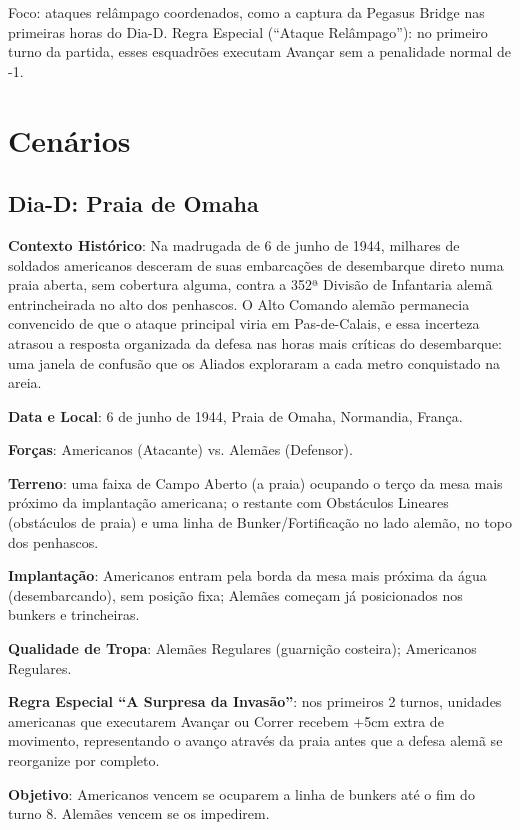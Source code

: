 \documentclass[11pt]{article}
\begin{document}
Foco: ataques relâmpago coordenados, como a captura da Pegasus Bridge nas primeiras horas do Dia-D. Regra Especial (``Ataque Relâmpago''): no primeiro turno da partida, esses esquadrões executam Avançar sem a penalidade normal de -1.

\section{Cenários}

\subsection{Dia-D: Praia de Omaha}

\textbf{Contexto Histórico}: Na madrugada de 6 de junho de 1944, milhares de soldados americanos desceram de suas embarcações de desembarque direto numa praia aberta, sem cobertura alguma, contra a 352ª Divisão de Infantaria alemã entrincheirada no alto dos penhascos. O Alto Comando alemão permanecia convencido de que o ataque principal viria em Pas-de-Calais, e essa incerteza atrasou a resposta organizada da defesa nas horas mais críticas do desembarque: uma janela de confusão que os Aliados exploraram a cada metro conquistado na areia.

\textbf{Data e Local}: 6 de junho de 1944, Praia de Omaha, Normandia, França.

\textbf{Forças}: Americanos (Atacante) vs. Alemães (Defensor).

\textbf{Terreno}: uma faixa de Campo Aberto (a praia) ocupando o terço da mesa mais próximo da implantação americana; o restante com Obstáculos Lineares (obstáculos de praia) e uma linha de Bunker/Fortificação no lado alemão, no topo dos penhascos.

\textbf{Implantação}: Americanos entram pela borda da mesa mais próxima da água (desembarcando), sem posição fixa; Alemães começam já posicionados nos bunkers e trincheiras.

\textbf{Qualidade de Tropa}: Alemães Regulares (guarnição costeira); Americanos Regulares.

\textbf{Regra Especial ``A Surpresa da Invasão''}: nos primeiros 2 turnos, unidades americanas que executarem Avançar ou Correr recebem +5cm extra de movimento, representando o avanço através da praia antes que a defesa alemã se reorganize por completo.

\textbf{Objetivo}: Americanos vencem se ocuparem a linha de bunkers até o fim do turno 8. Alemães vencem se os impedirem.
\end{document}
